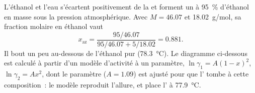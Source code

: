 \begin{example}\label{ex:b2:liquid-vapour-diagrams:ethanol-water}
L'éthanol et l'eau s'écartent positivement de la  et forment un 
à 95~\% d'éthanol en masse sous la pression atmosphérique. Avec $M = 46.07$ et
\qty{18.02}{g/mol}, sa fraction molaire en éthanol vaut
\[
  x_{\text{az}} = \frac{95/46.07}{95/46.07 + 5/18.02} = 0.881 .
\]
Il bout un peu au-dessous de l'éthanol pur (\qty{78.3}{\degreeCelsius}). Le diagramme
ci-dessous est calculé à partir d'un modèle d'activité à un paramètre, $\ln\gamma_1 = A(1 -
x)^2$, $\ln\gamma_2 = Ax^2$, dont le paramètre ($A = 1.09$) est ajusté pour que
l' tombe à cette composition~: le modèle reproduit l'allure, et
place l' à \qty{77.9}{\degreeCelsius}.
\end{example}

